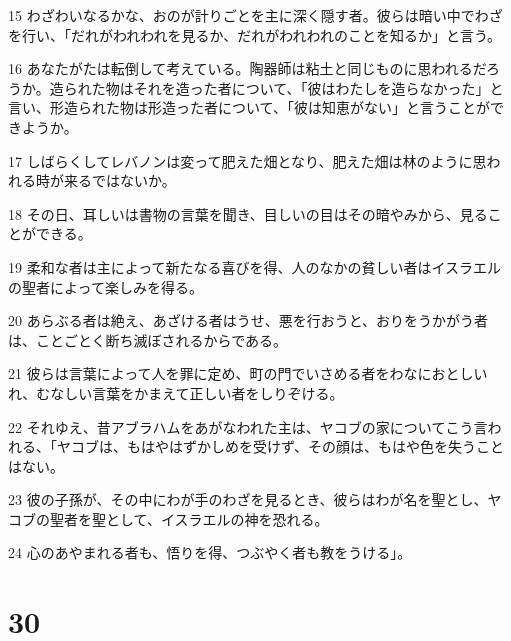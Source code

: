\par 15 わざわいなるかな、おのが計りごとを主に深く隠す者。彼らは暗い中でわざを行い、「だれがわれわれを見るか、だれがわれわれのことを知るか」と言う。
\par 16 あなたがたは転倒して考えている。陶器師は粘土と同じものに思われるだろうか。造られた物はそれを造った者について、「彼はわたしを造らなかった」と言い、形造られた物は形造った者について、「彼は知恵がない」と言うことができようか。
\par 17 しばらくしてレバノンは変って肥えた畑となり、肥えた畑は林のように思われる時が来るではないか。
\par 18 その日、耳しいは書物の言葉を聞き、目しいの目はその暗やみから、見ることができる。
\par 19 柔和な者は主によって新たなる喜びを得、人のなかの貧しい者はイスラエルの聖者によって楽しみを得る。
\par 20 あらぶる者は絶え、あざける者はうせ、悪を行おうと、おりをうかがう者は、ことごとく断ち滅ぼされるからである。
\par 21 彼らは言葉によって人を罪に定め、町の門でいさめる者をわなにおとしいれ、むなしい言葉をかまえて正しい者をしりぞける。
\par 22 それゆえ、昔アブラハムをあがなわれた主は、ヤコブの家についてこう言われる、「ヤコブは、もはやはずかしめを受けず、その顔は、もはや色を失うことはない。
\par 23 彼の子孫が、その中にわが手のわざを見るとき、彼らはわが名を聖とし、ヤコブの聖者を聖として、イスラエルの神を恐れる。
\par 24 心のあやまれる者も、悟りを得、つぶやく者も教をうける」。

\chapter{30}

